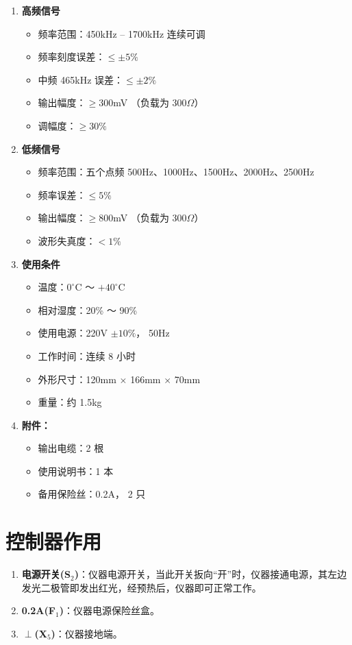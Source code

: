 \documentclass[12pt,UTF8]{ctexbook}
\begin{document}
\begin{enumerate}
	\item \textbf{高频信号}
	\begin{itemize}
		\item 频率范围：450kHz -- 1700kHz 连续可调
		\item 频率刻度误差：\(\le \pm 5\%\)
		\item 中频 465kHz 误差：\(\le \pm 2\%\)
		\item 输出幅度：\(\ge 300\)mV （负载为 300\(\Omega\)）
		\item 调幅度：\(\ge 30\%\)
	\end{itemize}
	\item \textbf{低频信号}
	\begin{itemize}
		\item 频率范围：五个点频 500Hz、1000Hz、1500Hz、2000Hz、2500Hz
		\item 频率误差：\(\le 5\%\)
		\item 输出幅度：\(\ge 800\)mV （负载为 300\(\Omega\)）
		\item 波形失真度：\(< 1\%\)
	\end{itemize}
	\item \textbf{使用条件}
	\begin{itemize}
		\item 温度：\(0^\circ\)C ～ \(+40^\circ\)C
		\item 相对湿度：20\% ～ 90\%
		\item 使用电源：220V \(\pm 10\%\)， 50Hz
		\item 工作时间：连续 8 小时
		\item 外形尺寸：120mm \(\times\) 166mm \(\times\) 70mm
		\item 重量：约 1.5kg
	\end{itemize}
	\item \textbf{附件：}
	\begin{itemize}
		\item 输出电缆：2 根
		\item 使用说明书：1 本
		\item 备用保险丝：0.2A， 2 只
	\end{itemize}
\end{enumerate}
	
\section{控制器作用}

\begin{enumerate}
\item \textbf{电源开关(S\(_2\))}：仪器电源开关，当此开关扳向“开”时，仪器接通电源，其左边发光二极管即发出红光，经预热后，仪器即可正常工作。
\item \textbf{0.2A(F\(_1\))}：仪器电源保险丝盒。
\item \textbf{\(\perp\)(X\(_5\))}：仪器接地端。
\end{enumerate}
\end{document}
